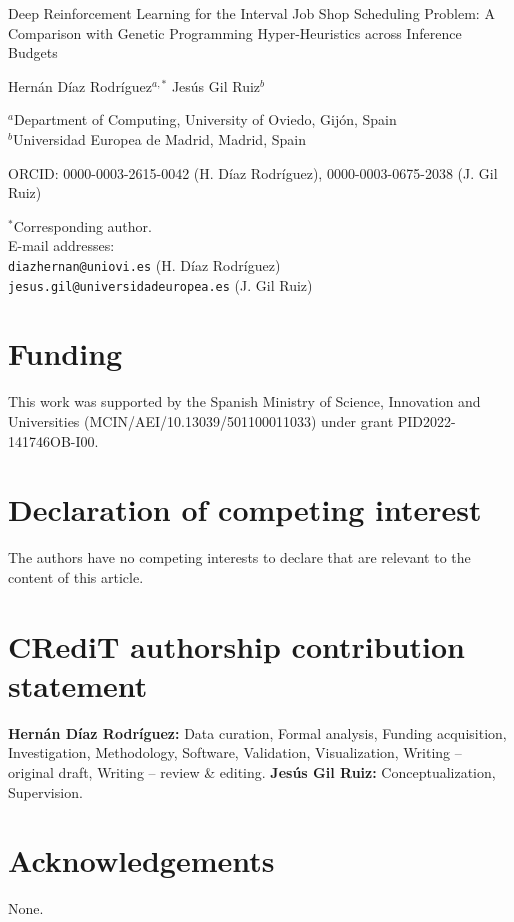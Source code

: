 \documentclass[12pt]{article}
\begin{document}
\begin{center}
{\LARGE Deep Reinforcement Learning for the Interval Job Shop
Scheduling Problem: A Comparison with Genetic Programming
Hyper-Heuristics across Inference Budgets}

\vspace{1.5em}
{\large Hern\'an D\'iaz Rodr\'iguez$^{a,*}$ \quad Jes\'us Gil Ruiz$^{b}$}

\vspace{0.8em}
$^{a}$Department of Computing, University of Oviedo, Gij\'on, Spain\\
$^{b}$Universidad Europea de Madrid, Madrid, Spain

\vspace{0.5em}
ORCID: 0000-0003-2615-0042 (H. D\'iaz Rodr\'iguez),
0000-0003-0675-2038 (J. Gil Ruiz)
\end{center}

\vspace{1em}
$^{*}$Corresponding author.\\
E-mail addresses:\\
\texttt{diazhernan@uniovi.es} (H. D\'iaz Rodr\'iguez)\\
\texttt{jesus.gil@universidadeuropea.es} (J. Gil Ruiz)

\section*{Funding}
This work was supported by the Spanish Ministry of Science,
Innovation and Universities (MCIN/AEI/10.13039/501100011033) under
grant PID2022-141746OB-I00.

\section*{Declaration of competing interest}
The authors have no competing interests to declare that are relevant
to the content of this article.

\section*{CRediT authorship contribution statement}
\textbf{Hern\'an D\'iaz Rodr\'iguez:} Data curation, Formal analysis,
Funding acquisition, Investigation, Methodology, Software,
Validation, Visualization, Writing -- original draft, Writing --
review \& editing.
\textbf{Jes\'us Gil Ruiz:} Conceptualization, Supervision.

\section*{Acknowledgements}
None.
\end{document}
